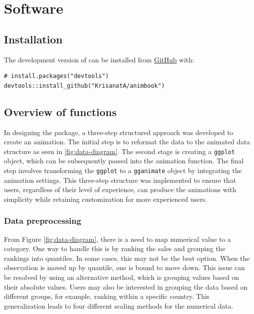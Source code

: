 \hypertarget{software}{%
\section{Software}\label{software}}

\hypertarget{installation}{%
\subsection{Installation}\label{installation}}

The development version of  can be installed from \href{https://github.com/KrisanatA/animbook}{GitHub} with:

\begin{verbatim}
# install.packages("devtools")
devtools::install_github("KrisanatA/animbook")
\end{verbatim}

\hypertarget{overview-of-functions}{%
\subsection{Overview of functions}\label{overview-of-functions}}

In designing the  package, a three-step structured approach was developed to create an animation. The initial step is to reformat the data to the animated data structure as seen in \ref{fig:data-diagram}. The second stage is creating a \texttt{ggplot} object, which can be subsequently passed into the animation function. The final step involves transforming the \texttt{ggplot} to a \texttt{gganimate} object by integrating the animation settings. This three-step structure was implemented to ensure that users, regardless of their level of experience, can produce the animations with simplicity while retaining customization for more experienced users.

\hypertarget{data-preprocessing}{%
\subsubsection{Data preprocessing}\label{data-preprocessing}}

From Figure \ref{fig:data-diagram}, there is a need to map numerical value to a category. One way to handle this is by ranking the sales and grouping the rankings into quantiles. In some cases, this may not be the best option. When the observation is moved up by quantile, one is bound to move down. This issue can be resolved by using an alternative method, which is grouping values based on their absolute values. Users may also be interested in grouping the data based on different groups, for example, ranking within a specific country. This generalization leads to four different scaling methods for the numerical data.

